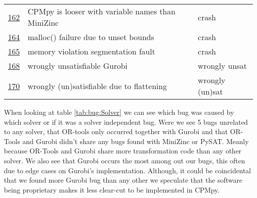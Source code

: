 \begin{table}[]
\begin{tabular}{lll}
		\href{https://github.com/CPMpy/cpmpy/issues/162}{162} & CPMpy is looser with variable names than MiniZinc & crash           \\
		\href{https://github.com/CPMpy/cpmpy/issues/164}{164} & malloc() failure due to unset bounds              & crash           \\
		\href{https://github.com/CPMpy/cpmpy/issues/165}{165} & memory violation segmentation fault               & crash           \\
		\href{https://github.com/CPMpy/cpmpy/issues/168}{168} & wrongly unsatisfiable Gurobi                      & wrongly unsat   \\
		\href{https://github.com/CPMpy/cpmpy/issues/170}{170} & wrongly (un)satisfiable due to flattening         & wrongly (un)sat \\ \bottomrule
	\end{tabular}
\end{table}

\label{res:SolverResponsible}
When looking at table \ref{tab:bug:Solver} we can see which bug was caused by which solver or if it was a solver independent bug. Were we see 5 bugs unrelated to any solver, that OR-tools only occurred together with Gurobi and that OR-Tools and Gurobi didn't share any bugs found with MiniZinc or PySAT. Meanly because OR-Tools and Gurobi share more transformation code than any other solver. We also see that Gurobi occurs the most among out our bugs, this often due to edge cases on Gurobi's implementation. Although, it could be coincidental that we found more Gurobi bug than any other we speculate that the software being proprietary makes it less clear-cut to be implemented in CPMpy.

